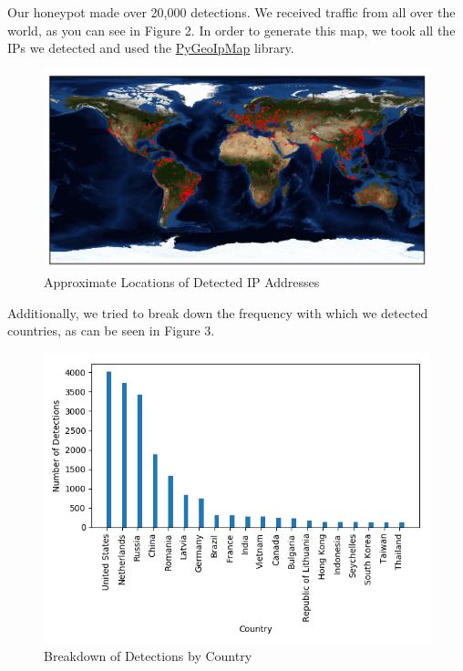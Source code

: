 \documentclass[a0,landscape]{a0poster}
\begin{document}
\begin{multicols}{3}
Our honeypot made over 20,000 detections. We received traffic from all over the world, as you can see in Figure 2. In order to generate this map, we took all the IPs we detected and used the \href{https://github.com/pieqq/PyGeoIpMap}{PyGeoIpMap} library.
\begin{figure}[H]
	\begin{center}
		\includegraphics[width=30cm]{map.png}
		\caption{Approximate Locations of Detected IP Addresses}
	\end{center}
\end{figure} 

Additionally, we tried to break down the frequency with which we detected countries, as can be seen in Figure 3. 
\begin{figure}[H]
	\begin{center}
		\includegraphics[width=25cm]{top_countries.png}
		\caption{Breakdown of Detections by Country}
	\end{center}
\end{figure} 


\end{multicols}
\end{document}
